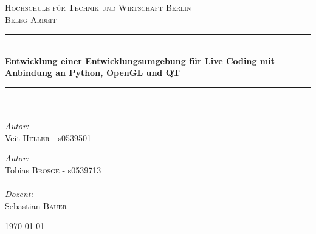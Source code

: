 \begin{titlepage}
\begin{center}


\textsc{\Large Hochschule für Technik und Wirtschaft Berlin}\\[1.5cm]

\textsc{\Large Beleg-Arbeit}\\[0.5cm]


\newcommand{\HRule}{\rule{\linewidth}{0.5mm}}
\HRule \\[0.4cm]
{ \huge \bfseries Entwicklung einer Entwicklungsumgebung für Live Coding mit Anbindung an Python, OpenGL und QT}\\[0.4cm]

\HRule \\[1.5cm]

\paragraph{}
\begin{minipage}{0.4\textwidth}
\begin{flushleft} \large
\emph{Autor:}\\
Veit \textsc{Heller} - s0539501
\end{flushleft}
\end{minipage}
\hfill
\begin{minipage}{0.4\textwidth}
\begin{flushright} \large
\emph{Autor:}\\
Tobias \textsc{Brosge} - s0539713
\end{flushright}
\end{minipage}
\paragraph{}
\paragraph{}
\begin{minipage}{0.4\textwidth}
\begin{center} \large
\emph{Dozent:}\\
Sebastian \textsc{Bauer} 
\end{center}
\end{minipage}


\vfill

{\large \today}

\end{center}

\end{titlepage}
